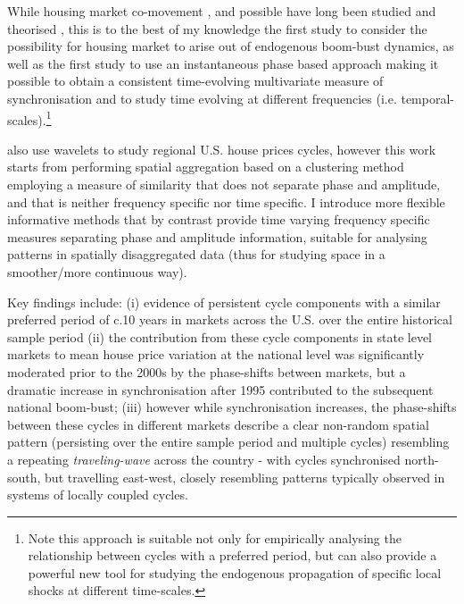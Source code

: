 \documentclass[11pt]{article}
\begin{document}
While housing market co-movement \cite{DelNegro2007}, and possible  have long been studied and theorised \citep{Meen1996,Meen1999}, this is to the best of my knowledge the first study to consider the possibility for housing market  to arise out of endogenous boom-bust dynamics, as well as the first study to use an instantaneous phase based approach making it possible to obtain a consistent time-evolving multivariate measure of synchronisation and to study time evolving  at different frequencies (i.e. temporal-scales).\footnote{Note this approach is suitable not only for empirically analysing the relationship between cycles with a preferred period, but can also provide a powerful new tool for studying the endogenous propagation of specific local shocks at different time-scales.} %


\cite{Flor2017} also use wavelets to study regional U.S. house prices cycles, however this work starts from performing spatial aggregation based on a clustering method employing a measure of similarity that does not separate phase and amplitude, and that is neither frequency specific nor time specific. I introduce more flexible informative methods that by contrast provide time varying frequency specific measures separating phase and amplitude information, suitable for analysing patterns in spatially disaggregated data (thus for studying space in a smoother/more continuous way).


Key findings include: (i) evidence of persistent cycle components with a similar preferred period of c.10 years in markets across the U.S. over the entire historical sample period (ii) the contribution
from these cycle components in state level markets to mean house price variation at the national
level was significantly moderated prior to the 2000s by the
phase-shifts between markets, but a dramatic increase
in synchronisation after 1995 contributed to the subsequent
national boom-bust; (iii) however while synchronisation increases, the phase-shifts between these cycles in different markets describe a clear non-random spatial pattern (persisting over the entire sample period and multiple cycles) resembling a repeating \textit{traveling-wave} across the country - with cycles synchronised north-south, but travelling east-west, closely resembling patterns typically observed in systems of locally coupled cycles. %
\end{document}
